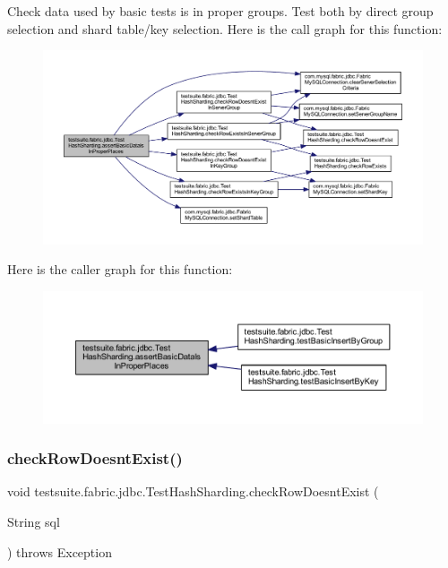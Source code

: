 Check data used by basic tests is in proper groups. Test both by direct group selection and shard table/key selection. Here is the call graph for this function\+:
\nopagebreak
\begin{figure}[H]
\begin{center}
\leavevmode
\includegraphics[width=350pt]{classtestsuite_1_1fabric_1_1jdbc_1_1_test_hash_sharding_a54c7662d69f56fc657d35bd049d87f1b_cgraph}
\end{center}
\end{figure}
Here is the caller graph for this function\+:
\nopagebreak
\begin{figure}[H]
\begin{center}
\leavevmode
\includegraphics[width=350pt]{classtestsuite_1_1fabric_1_1jdbc_1_1_test_hash_sharding_a54c7662d69f56fc657d35bd049d87f1b_icgraph}
\end{center}
\end{figure}
\mbox{\label{classtestsuite_1_1fabric_1_1jdbc_1_1_test_hash_sharding_ae116d36f4a6b60e7a5e0faf1f7a7774f}} 
\subsubsection{\texorpdfstring{check\+Row\+Doesnt\+Exist()}{checkRowDoesntExist()}}
{\footnotesize\ttfamily void testsuite.\+fabric.\+jdbc.\+Test\+Hash\+Sharding.\+check\+Row\+Doesnt\+Exist (\begin{DoxyParamCaption}\item[{String}]{sql }\end{DoxyParamCaption}) throws Exception\hspace{0.3cm}{\ttfamily [protected]}}

